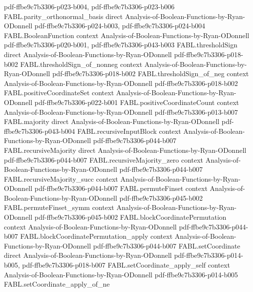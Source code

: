 \begin{theorem}
  {pdf-ffbe9c7b3306-p023-b004,
    pdf-ffbe9c7b3306-p023-b006}
\proofstep
  {FABL.parity_orthonormal_basis}
  {direct}
  {Analysis-of-Boolean-Functions-by-Ryan-ODonnell}
  {pdf-ffbe9c7b3306-p024-b003,
    pdf-ffbe9c7b3306-p024-b004}
\proofstep
  {FABL.BooleanFunction}
  {context}
  {Analysis-of-Boolean-Functions-by-Ryan-ODonnell}
  {pdf-ffbe9c7b3306-p020-b001,
    pdf-ffbe9c7b3306-p043-b003}
\proofstep
  {FABL.thresholdSign}
  {direct}
  {Analysis-of-Boolean-Functions-by-Ryan-ODonnell}
  {pdf-ffbe9c7b3306-p018-b002}
\proofstep
  {FABL.thresholdSign_of_nonneg}
  {context}
  {Analysis-of-Boolean-Functions-by-Ryan-ODonnell}
  {pdf-ffbe9c7b3306-p018-b002}
\proofstep
  {FABL.thresholdSign_of_neg}
  {context}
  {Analysis-of-Boolean-Functions-by-Ryan-ODonnell}
  {pdf-ffbe9c7b3306-p018-b002}
\proofstep
  {FABL.positiveCoordinateSet}
  {context}
  {Analysis-of-Boolean-Functions-by-Ryan-ODonnell}
  {pdf-ffbe9c7b3306-p022-b001}
\proofstep
  {FABL.positiveCoordinateCount}
  {context}
  {Analysis-of-Boolean-Functions-by-Ryan-ODonnell}
  {pdf-ffbe9c7b3306-p013-b007}
\proofstep
  {FABL.majority}
  {direct}
  {Analysis-of-Boolean-Functions-by-Ryan-ODonnell}
  {pdf-ffbe9c7b3306-p043-b004}
\proofstep
  {FABL.recursiveInputBlock}
  {context}
  {Analysis-of-Boolean-Functions-by-Ryan-ODonnell}
  {pdf-ffbe9c7b3306-p044-b007}
\proofstep
  {FABL.recursiveMajority}
  {direct}
  {Analysis-of-Boolean-Functions-by-Ryan-ODonnell}
  {pdf-ffbe9c7b3306-p044-b007}
\proofstep
  {FABL.recursiveMajority_zero}
  {context}
  {Analysis-of-Boolean-Functions-by-Ryan-ODonnell}
  {pdf-ffbe9c7b3306-p044-b007}
\proofstep
  {FABL.recursiveMajority_succ}
  {context}
  {Analysis-of-Boolean-Functions-by-Ryan-ODonnell}
  {pdf-ffbe9c7b3306-p044-b007}
\proofstep
  {FABL.permuteFinset}
  {context}
  {Analysis-of-Boolean-Functions-by-Ryan-ODonnell}
  {pdf-ffbe9c7b3306-p045-b002}
\proofstep
  {FABL.permuteFinset_symm}
  {context}
  {Analysis-of-Boolean-Functions-by-Ryan-ODonnell}
  {pdf-ffbe9c7b3306-p045-b002}
\proofstep
  {FABL.blockCoordinatePermutation}
  {context}
  {Analysis-of-Boolean-Functions-by-Ryan-ODonnell}
  {pdf-ffbe9c7b3306-p044-b007}
\proofstep
  {FABL.blockCoordinatePermutation_apply}
  {context}
  {Analysis-of-Boolean-Functions-by-Ryan-ODonnell}
  {pdf-ffbe9c7b3306-p044-b007}
\proofstep
  {FABL.setCoordinate}
  {direct}
  {Analysis-of-Boolean-Functions-by-Ryan-ODonnell}
  {pdf-ffbe9c7b3306-p014-b005,
    pdf-ffbe9c7b3306-p018-b007}
\proofstep
  {FABL.setCoordinate_apply_self}
  {context}
  {Analysis-of-Boolean-Functions-by-Ryan-ODonnell}
  {pdf-ffbe9c7b3306-p014-b005}
\proofstep
  {FABL.setCoordinate_apply_of_ne}

\end{theorem}
